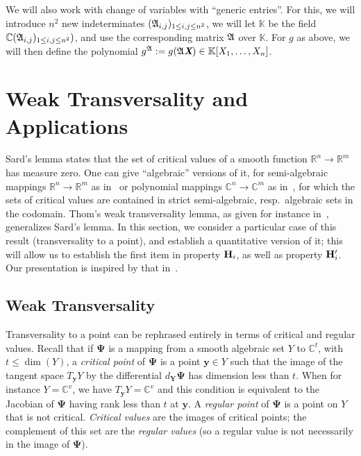 \documentclass[sigconf]{acmart}
\def\Xb{\textit{\textbf{X}}}
\def\fA{{\frak A}}
\def\C{\mathbb{C}}
\def\R{\mathbb{R}}
\def\K{\mathbb{K}}
\begin{document}
We will also work with change of variables with ``generic entries''.
For this, we will introduce $n^2$ new indeterminates $(\frak
A_{i,j})_{1\le i,j \le n^2}$, we will let $\K$ be the field $\C(\frak
A_{i,j})_{1\le i,j \le n^2})$, and use the corresponding matrix $ \fA$
over $\K$. For $g$ as above, we will then define the polynomial 
$g^\fA:=g(\fA \Xb) \in \K[X_1,\dots,X_n]$.



\section{Weak Transversality and Applications}

Sard's lemma states that the set of critical values of a smooth
function $\R^n \to \R^m$ has measure zero. One can give ``algebraic''
versions of it, for semi-algebraic mappings $\R^n \to \R^m$ as
in~\cite[Chapter~9]{bochnak1998real} or polynomial mappings $\C^n \to
\C^m$ as in~\cite[Chapter~3]{Mumford76}, for which the sets of
critical values are contained in strict semi-algebraic,
resp.\ algebraic sets in the codomain. Thom's weak transversality
lemma, as given for instance in~\cite{demazure2000bifurcations},
generalizes Sard's lemma. In this section, we consider a particular
case of this result (transversality to a point), and establish a
quantitative version of it; this will allow us to establish the first
item in property ${\bf H}_i$, as well as property ${\bf H}'_i$. Our
presentation is inspired by that in~\cite{TWT}.



\subsection{Weak Transversality}

Transversality to a point can be rephrased entirely in terms of
critical and regular values. Recall that if $\bm \Psi$ is a mapping
from a smooth algebraic set $Y$ to $\C^t$, with $t\le \dim(Y)$, a {\em
  critical point} of $\bm \Psi$ is a point $\bm y \in Y$ such that the
image of the tangent space $T_{\bm y} Y$ by the differential $d_{\bm
  Y} \bm \Psi$ has dimension less than $t$. When for instance
$Y=\C^v$, we have $T_{\bm y} Y=\C^v$ and this condition is equivalent
to the Jacobian of $\bm \Psi$ having rank less than $t$ at $\bm y$.  A
{\em regular point} of $\bm \Psi$ is a point on $Y$ that is not
critical. {\em Critical values} are the images of critical points; the
complement of this set are the {\em regular values} (so a regular
value is not necessarily in the image of $\bm\Psi$).
\end{document}
